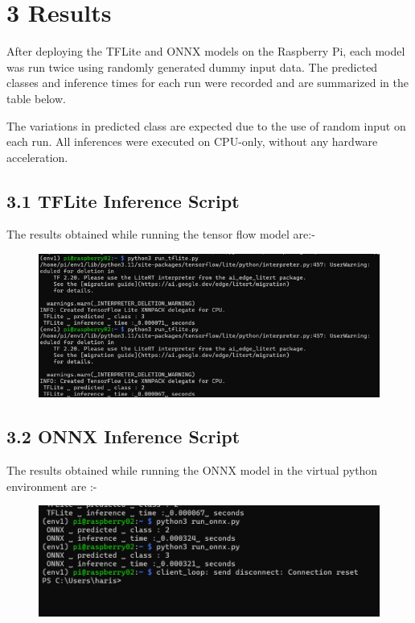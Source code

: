 \documentclass[12pt]{article}
\begin{document}
\section*{3 Results}
After deploying the TFLite and ONNX models on the Raspberry Pi, each model was run twice using randomly generated dummy input data. The predicted classes and inference times for each run were recorded and are summarized in the table below.

The variations in predicted class are expected due to the use of random input on each run. All inferences were executed on CPU-only, without any hardware acceleration.






    \subsection*{3.1 TFLite Inference Script}
    The results obtained while running the tensor flow model are:-


    
\begin{figure}[H]
    \centering
    \includegraphics[width=1\linewidth]{Screenshot3.png}
    \label{fig:enter-label}
\end{figure}

 
\subsection *{3.2 ONNX Inference Script}

The results obtained while running the ONNX model in the virtual python environment are :-


\begin{figure}[H]
    \centering
    \includegraphics[width=1\linewidth]{Screenshot4.png}
    \label{fig:enter-label}
\end{figure}
\end{document}
